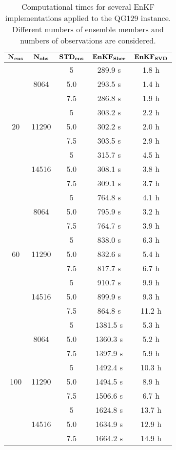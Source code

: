 \documentclass[12pt]{article}
\begin{document}
\begin{table}[H]
\centering
{\footnotesize
\begin{tabular}{|c|c|c|c|c|} \hline
$\bf N_{ens}$ & $\bf N_{obs}$ & $\bf STD_{ens}$ & ${\bf  EnKF_{Sher}  }$ & ${\bf EnKF_{SVD}  }$ \\ \hline

\multirow{9}{*}{20} &  \multirow{3}{*}{8064}  & 5 & 289.9 s & 1.8 h \\
& & 5.0 & 293.5 s & 1.4 h \\ 
& & 7.5 & 286.8 s &  1.9 h  \\ 
\cline{2-5}
&  \multirow{3}{*}{11290}  & 5 & 303.2 s & 2.2 h  \\
& & 5.0 & 302.2 s & 2.0 h   \\ 
& & 7.5 & 303.5 s &  2.9  h  \\ 
\cline{2-5}
&  \multirow{3}{*}{14516}  & 5 & 315.7 s & 4.5 h  \\
& & 5.0 & 308.1 s & 3.8 h  \\ 
& & 7.5 & 309.1 s &   3.7 h  \\ 
\cline{1-5}
\multirow{9}{*}{60} &  \multirow{3}{*}{8064}  & 5 & 764.8 s & 4.1 h \\
& & 5.0 & 795.9 s &  3.2 h   \\ 
& & 7.5 & 764.7 s & 3.9 h   \\ 
\cline{2-5}
&  \multirow{3}{*}{11290}  & 5 & 838.0 s &  6.3 h \\
& & 5.0 & 832.6 s & 5.4 h  \\ 
& & 7.5 & 817.7 s & 6.7 h   \\ 
\cline{2-5}
&  \multirow{3}{*}{14516}  & 5 & 910.7 s &  9.9 h  \\
& & 5.0 & 899.9 s &  9.3 h   \\ 
& & 7.5 & 864.8 s &  11.2 h   \\ 
\cline{1-5}
\multirow{9}{*}{100} &  \multirow{3}{*}{8064}  & 5 & 1381.5 s & 5.3 h \\
& & 5.0 & 1360.3 s & 5.2 h  \\ 
& & 7.5 & 1397.9 s & 5.9 h   \\ 
\cline{2-5}
&  \multirow{3}{*}{11290}  & 5 & 1492.4 s & 10.3 h  \\
& & 5.0 & 1494.5 s &  8.9 h   \\ 
& & 7.5 & 1506.6 s & 6.7 h   \\ 
\cline{2-5}
&  \multirow{3}{*}{14516}  & 5 & 1624.8 s & 13.7 h  \\
& & 5.0 & 1634.9 s & 12.9 h   \\ 
& & 7.5 & 1664.2 s & 14.9 h   \\ 
\hline
\end{tabular}
}
\caption{Computational times for several EnKF implementations applied to the QG129 instance.
Different numbers of ensemble members and numbers of observations are considered.}
\label{Tab:QG129-Results-ElapsedTime}
\end{table}
\end{document}
